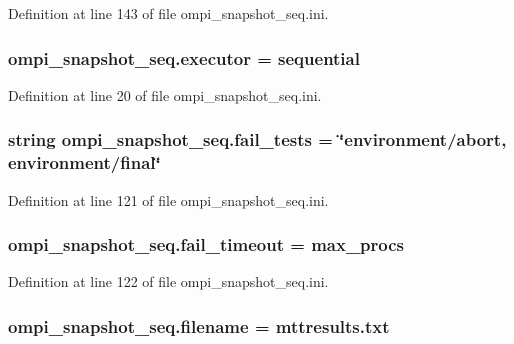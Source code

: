 Definition at line 143 of file ompi\-\_\-snapshot\-\_\-seq.\-ini.

\hypertarget{namespaceompi__snapshot__seq_a6293c71d0991763a4bad8b010e0e6ce2}{
\subsubsection[{executor}]{\setlength{\rightskip}{0pt plus 5cm}ompi\-\_\-snapshot\-\_\-seq.\-executor = sequential}}\label{namespaceompi__snapshot__seq_a6293c71d0991763a4bad8b010e0e6ce2}


Definition at line 20 of file ompi\-\_\-snapshot\-\_\-seq.\-ini.

\hypertarget{namespaceompi__snapshot__seq_a1c6caf43d8724d112db736b1cc590bef}{
\subsubsection[{fail\-\_\-tests}]{\setlength{\rightskip}{0pt plus 5cm}string ompi\-\_\-snapshot\-\_\-seq.\-fail\-\_\-tests = \char`\"{}environment/abort, environment/final\char`\"{}}}\label{namespaceompi__snapshot__seq_a1c6caf43d8724d112db736b1cc590bef}


Definition at line 121 of file ompi\-\_\-snapshot\-\_\-seq.\-ini.

\hypertarget{namespaceompi__snapshot__seq_ac68ac424f71d3b098f0e5742e90083c1}{
\subsubsection[{fail\-\_\-timeout}]{\setlength{\rightskip}{0pt plus 5cm}ompi\-\_\-snapshot\-\_\-seq.\-fail\-\_\-timeout = max\-\_\-procs}}\label{namespaceompi__snapshot__seq_ac68ac424f71d3b098f0e5742e90083c1}


Definition at line 122 of file ompi\-\_\-snapshot\-\_\-seq.\-ini.

\hypertarget{namespaceompi__snapshot__seq_ac375b04988441d39d7dbd8546bede172}{
\subsubsection[{filename}]{\setlength{\rightskip}{0pt plus 5cm}ompi\-\_\-snapshot\-\_\-seq.\-filename = mttresults.\-txt}}\label{namespaceompi__snapshot__seq_ac375b04988441d39d7dbd8546bede172}


